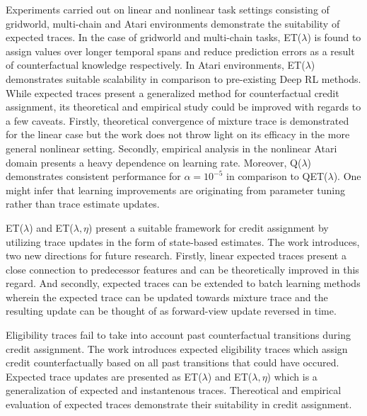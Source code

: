 \documentclass[11pt,letterpaper]{article}
\begin{document}
Experiments carried out on linear and nonlinear task settings consisting of gridworld, multi-chain and Atari environments demonstrate the suitability of expected traces. In the case of gridworld and multi-chain tasks, ET($\lambda$) is found to assign values over longer temporal spans and reduce prediction errors as a result of counterfactual knowledge respectively. In Atari environments, ET($\lambda$) demonstrates suitable scalability in comparison to pre-existing Deep RL methods. While expected traces present a generalized method for counterfactual credit assignment, its theoretical and empirical study could be improved with regards to a few caveats. Firstly, theoretical convergence of mixture trace is demonstrated for the linear case but the work does not throw light on its efficacy in the more general nonlinear setting. Secondly, empirical analysis in the nonlinear Atari domain presents a heavy dependence on learning rate. Moreover, Q($\lambda$) demonstrates consistent performance for $\alpha=10^{-5}$ in comparison to QET($\lambda$). One might infer that learning improvements are originating from parameter tuning rather than trace estimate updates. 

ET($\lambda$) and ET($\lambda,\eta$) present a suitable framework for credit assignment by utilizing trace updates in the form of state-based estimates. The work introduces, two new directions for future research. Firstly, linear expected traces present a close connection to predecessor features and can be theoretically improved in this regard. And secondly, expected traces can be extended to batch learning methods wherein the expected trace can be updated towards mixture trace and the resulting update can be thought of as forward-view update reversed in time. 

Eligibility traces fail to take into account past counterfactual transitions during credit assignment. The work introduces expected eligibility traces which assign credit counterfactually based on all past transitions that could have occured. Expected trace updates are presented as ET($\lambda$) and ET($\lambda,\eta$) which is a generalization of expected and instantenous traces. Thereotical and empirical evaluation of expected traces demonstrate their suitability in credit assignment. 
\end{document}
